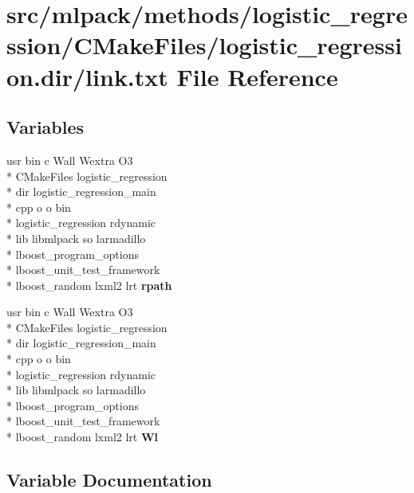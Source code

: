 \section{src/mlpack/methods/logistic\-\_\-regression/\-C\-Make\-Files/logistic\-\_\-regression.dir/link.txt File Reference}
\label{methods_2logistic__regression_2CMakeFiles_2logistic__regression_8dir_2link_8txt}
\subsection*{Variables}
\begin{DoxyCompactItemize}
\item 
usr bin c Wall Wextra O3 \\*
C\-Make\-Files logistic\-\_\-regression \\*
dir logistic\-\_\-regression\-\_\-main \\*
cpp o o bin \\*
logistic\-\_\-regression rdynamic \\*
lib libmlpack so larmadillo \\*
lboost\-\_\-program\-\_\-options \\*
lboost\-\_\-unit\-\_\-test\-\_\-framework \\*
lboost\-\_\-random lxml2 lrt {\bf rpath}
\item 
usr bin c Wall Wextra O3 \\*
C\-Make\-Files logistic\-\_\-regression \\*
dir logistic\-\_\-regression\-\_\-main \\*
cpp o o bin \\*
logistic\-\_\-regression rdynamic \\*
lib libmlpack so larmadillo \\*
lboost\-\_\-program\-\_\-options \\*
lboost\-\_\-unit\-\_\-test\-\_\-framework \\*
lboost\-\_\-random lxml2 lrt {\bf Wl}
\end{DoxyCompactItemize}


\subsection{Variable Documentation}
